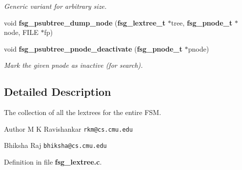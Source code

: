 \begin{DoxyCompactItemize}
\begin{DoxyCompactList}\small\item\em Generic variant for arbitrary size. \end{DoxyCompactList}\item 
void {\bfseries fsg\-\_\-psubtree\-\_\-dump\-\_\-node} ({\bf fsg\-\_\-lextree\-\_\-t} $\ast$tree, {\bf fsg\-\_\-pnode\-\_\-t} $\ast$node, F\-I\-L\-E $\ast$fp)\label{fsg__lextree_8c_a1d3204e8ce39bcb66c68b9ef1e2acb7d}

\item 
void {\bf fsg\-\_\-psubtree\-\_\-pnode\-\_\-deactivate} ({\bf fsg\-\_\-pnode\-\_\-t} $\ast$pnode)\label{fsg__lextree_8c_a6dc55ff3873855fb7b2c0390aa072516}

\begin{DoxyCompactList}\small\item\em Mark the given pnode as inactive (for search). \end{DoxyCompactList}\end{DoxyCompactItemize}


\subsection{Detailed Description}
The collection of all the lextrees for the entire F\-S\-M. \begin{DoxyAuthor}{Author}
M K Ravishankar {\tt rkm@cs.\-cmu.\-edu} 

Bhiksha Raj {\tt bhiksha@cs.\-cmu.\-edu} 
\end{DoxyAuthor}


Definition in file {\bf fsg\-\_\-lextree.\-c}.


